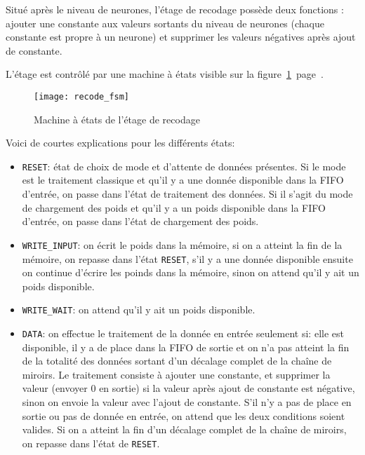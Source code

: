 Situé après le niveau de neurones, l'étage de recodage possède deux fonctions :
ajouter une constante aux valeurs sortants du niveau de neurones (chaque
constante est propre à un neurone) et
supprimer les valeurs négatives après ajout de constante.

L'étage est contrôlé par une machine à états visible sur la
figure~\ref{fig:recode_fsm}~page~\pageref{fig:recode_fsm}.

\begin{figure}[h!]
	\texttt{[image: recode\_fsm]}
	\caption{Machine à états de l'étage de recodage}
	\label{fig:recode_fsm}
\end{figure}

Voici de courtes explications pour les différents états:
\begin{itemize}
	\item \verb+RESET+: état de choix de mode et d'attente de données présentes.
		Si le mode est le traitement classique et qu'il y a une donnée
		disponible dans la FIFO d'entrée, on passe dans l'état de traitement
		des données. Si il s'agit du mode de chargement des poids
		et qu'il y a un poids disponible dans la FIFO d'entrée, on passe dans l'état
		de chargement des poids.
	\item \verb+WRITE_INPUT+: on écrit le poids dans la mémoire,
		si on a atteint la fin de la mémoire, on repasse dans l'état \verb+RESET+,
		s'il y a une donnée
		disponible ensuite on continue d'écrire les poinds dans la mémoire,
		sinon on attend qu'il y ait un poids disponible.
	\item \verb+WRITE_WAIT+: on attend qu'il y ait un poids disponible.
	\item \verb+DATA+: on effectue le traitement de la donnée en entrée seulement si:
		elle est disponible, il y a de place dans la FIFO de sortie et on n'a pas atteint
		la fin de la totalité des données sortant d'un décalage complet de la chaîne
		de miroirs. Le traitement consiste à ajouter une constante, et supprimer la valeur
		(envoyer 0 en sortie) si la valeur après ajout de constante est négative, sinon on
		envoie la valeur avec l'ajout de constante.
		S'il n'y a pas de place en sortie ou pas de donnée en entrée, on attend que les deux conditions
		soient valides.
		Si on a atteint la fin d'un décalage complet de la chaîne de miroirs, on repasse dans
		l'état de \verb+RESET+.
\end{itemize}

